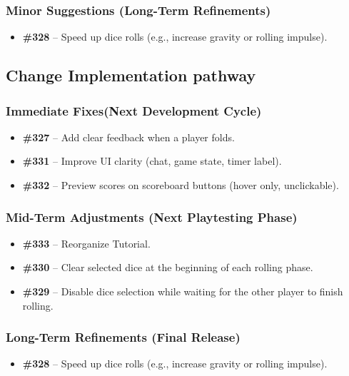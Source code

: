 \documentclass{article}
\begin{document}
\subsubsection{Minor Suggestions (Long-Term Refinements)}
\begin{itemize}
    \item \textbf{\#328} – Speed up dice rolls (e.g., increase gravity or rolling impulse).
\end{itemize}

\subsection{Change Implementation pathway}

\subsubsection{Immediate Fixes(Next Development Cycle)}
\begin{itemize}
    \item \textbf{\#327} – Add clear feedback when a player folds.
    \item \textbf{\#331} – Improve UI clarity (chat, game state, timer label).
    \item \textbf{\#332} – Preview scores on scoreboard buttons (hover only, unclickable).
\end{itemize}

\subsubsection{Mid-Term Adjustments (Next Playtesting Phase)}
\begin{itemize}
    \item \textbf{\#333} – Reorganize Tutorial.
    \item \textbf{\#330} – Clear selected dice at the beginning of each rolling phase.
    \item \textbf{\#329} – Disable dice selection while waiting for the other player to finish rolling.
\end{itemize}

\subsubsection{Long-Term Refinements (Final Release)}
\begin{itemize}
    \item \textbf{\#328} – Speed up dice rolls (e.g., increase gravity or rolling impulse).
\end{itemize}
\end{document}
